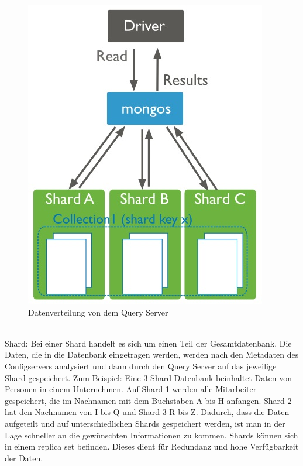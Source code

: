 \begin{figure}[hbt]
	\centering
	\includegraphics[scale=1]{images/sharded-cluster-scatter-gather-query.jpg} 
	\caption{Datenverteilung von dem Query Server}
\end{figure}
\\
Shard: Bei einer Shard handelt es sich um einen Teil der Gesamtdatenbank. Die Daten, die in die Datenbank eingetragen werden, werden nach den Metadaten des Configservers analysiert und dann durch den Query Server auf das jeweilige Shard gespeichert. Zum Beispiel: Eine 3 Shard Datenbank beinhaltet Daten von Personen in einem Unternehmen. Auf Shard 1 werden alle Mitarbeiter gespeichert, die im Nachnamen mit dem Buchstaben A bis H anfangen. Shard 2 hat den Nachnamen von I bis Q und Shard 3 R bis Z. Dadurch, dass die Daten aufgeteilt und auf unterschiedlichen Shards gespeichert werden, ist man in der Lage schneller an die gewünschten Informationen zu kommen. Shards können sich in einem replica set befinden. Dieses dient für Redundanz  und hohe Verfügbarkeit der Daten.
